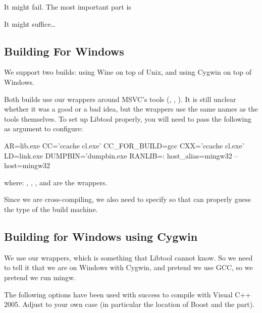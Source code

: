 It might fail.  The most important part is


It might suffice\ldots

\subsection{Building For Windows}

We support two builds: using Wine on top of Unix, and using Cygwin on
top of Windows.

Both builds use our wrappers around MSVC's tools (,
, ).  It is still unclear whether it
was a good or a bad idea, but the wrappers use the same names as the tools
themselves.  To set up Libtool properly, you will need to pass the following
as argument to configure:

\begin{shell}
AR=lib.exe
CC='ccache cl.exe'
CC_FOR_BUILD=gcc
CXX='ccache cl.exe'
LD=link.exe
DUMPBIN='dumpbin.exe
RANLIB=:
host_alias=mingw32
--host=mingw32
\end{shell}

where: , , , and
 are the wrappers.

Since we are cross-compiling, we also need to specify 
so that  can properly guess the type of the build
machine.

\subsection{Building for Windows using Cygwin}

We use our wrappers, which is something that Libtool cannot know.  So we
need to tell it that we are on Windows with Cygwin, and pretend we use GCC,
so we pretend we run mingw.

The following options have been used with success to compile \usdk with
Visual C++ 2005.  Adjust to your own case (in particular the location of
Boost and the  part).

